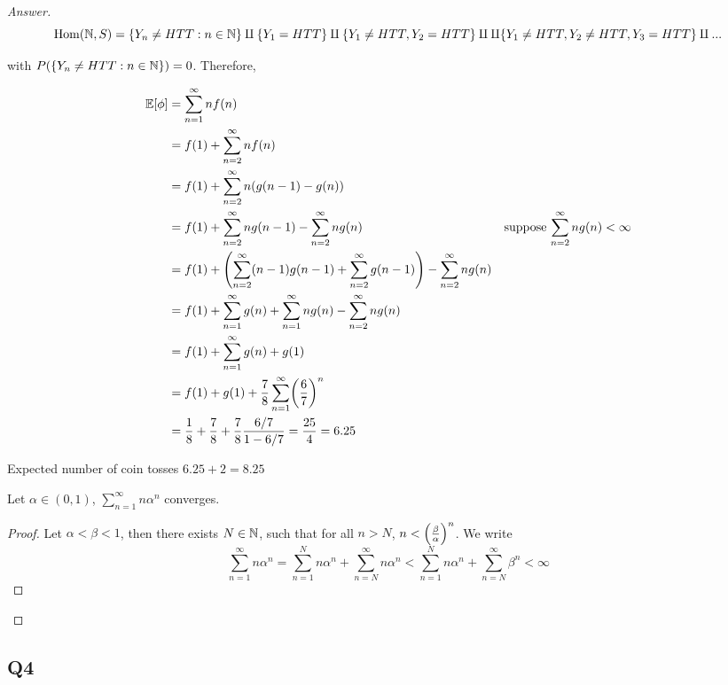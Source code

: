 \documentclass{article}
\begin{document}
\begin{proof}[Answer]
$$
    \Hom(\N, S) = \set{Y_n \neq HTT: n \in \N} \amalg \set{Y_1 = HTT} \amalg \set{Y_1 \neq HTT, Y_2 = HTT} \amalg \amalg \set{Y_1 \neq HTT, Y_2 \neq HTT, Y_3 = HTT} \amalg ...
$$

with $P(\set{Y_n \neq HTT: n \in \N}) = 0$. Therefore,

\begin{align*}
    \Exp[\phi]
    &= \sum_{n=1}^\infty n f(n) \\
    &= f(1) + \sum_{n=2}^\infty n f(n) \\
    &= f(1) + \sum_{n=2}^\infty n (g(n-1) - g(n)) \\
    &= f(1) + \sum_{n=2}^\infty n g(n-1) - \sum_{n=2}^\infty n g(n) &\text{suppose $\sum_{n=2}^\infty n g(n) < \infty$}\\
    &= f(1) + \tuple*{\sum_{n=2}^\infty (n-1) g(n-1) + \sum_{n=2}^\infty g(n-1)} - \sum_{n=2}^\infty n g(n) \\
    &= f(1) + \sum_{n=1}^\infty g(n) + \sum_{n=1}^\infty n g(n) - \sum_{n=2}^\infty n g(n) \\
    &= f(1) + \sum_{n=1}^\infty g(n) + g(1) \\
    &= f(1) + g(1) + \frac{7}{8} \sum_{n=1}^\infty \tuple*{\frac{6}{7}}^n \\
    &= \frac{1}{8} + \frac{7}{8} + \frac{7}{8} \frac{6/7}{1 - 6/7} = \frac{25}{4} = 6.25
\end{align*}

Expected number of coin tosses $6.25 + 2 = 8.25$

\begin{lemma}
    Let $\alpha \in (0, 1)$, $\sum_{n=1}^\infty n \alpha^n$ converges.
\begin{proof}
    Let $\alpha < \beta < 1$, then there exists $N \in \N$, such that for all $n > N$, $n < \tuple*{\frac{\beta}{\alpha}}^n$. We write 
    $$
        \sum_{n=1}^\infty n \alpha^n = \sum_{n=1}^N n \alpha^n + \sum_{n=N}^\infty n \alpha^n < \sum_{n=1}^N n \alpha^n + \sum_{n=N}^\infty \beta^n < \infty
    $$
\end{proof}
\end{lemma}

\end{proof}

\subsection{Q4}
\end{document}
